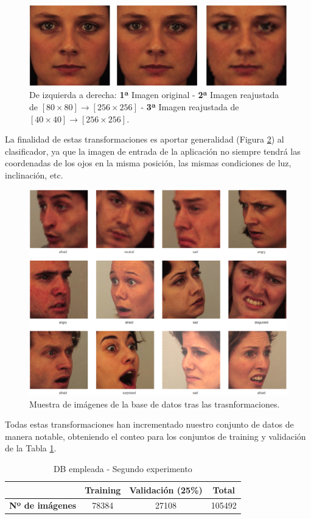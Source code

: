 \documentclass[a4paper,11pt]{book}
\begin{document}
\begin{enumerate}
		\begin{figure}[h]
			\centering
			\includegraphics[width=0.9\linewidth]{imagenes/segundoIntentoDA6}
			\caption[Experimento 2 Pixelado]{De izquierda a derecha: \textbf{1ª} Imagen original - \textbf{2ª} Imagen reajustada de \([80\times80] \longrightarrow [256\times256]\) - \textbf{3ª} Imagen reajustada de \([40\times40] \longrightarrow [256\times256]\).}
			\label{fig:segundoIntentoDA6}
		\end{figure}	
\end{enumerate}

La finalidad de estas transformaciones es aportar generalidad (Figura \ref{fig:segundoIntentoDBsample}) al clasificador, ya que la imagen de entrada de la aplicación no siempre tendrá las coordenadas de los ojos en la misma posición, las mismas condiciones de luz, inclinación, etc.
\begin{figure}[h]
	\centering
	\includegraphics[width=0.82\linewidth]{imagenes/segundoIntentoDBsample}
	\caption[Experimento 2 Muestra]{Muestra de imágenes de la base de datos tras las trasnformaciones.}
	\label{fig:segundoIntentoDBsample}
\end{figure}

Todas estas transformaciones han incrementado nuestro conjunto de datos de manera notable, obteniendo el conteo para los conjuntos de training y validación de la Tabla \ref{entr:segundoIntento-DB}.
\begin{table}[h]
	\centering
	\begin{tabular}{c|c|c|c|}
		\cline{2-4}
		& \textbf{Training} & \textbf{Validación} (25\%) & \textbf{Total} \\ \hline
		\multicolumn{1}{|c|}{\textbf{Nº de imágenes}} & 78384        & 27108          & 105492     \\ \hline
	\end{tabular}
	\caption{DB empleada - Segundo experimento}
	\label{entr:segundoIntento-DB}
\end{table}
\end{document}

